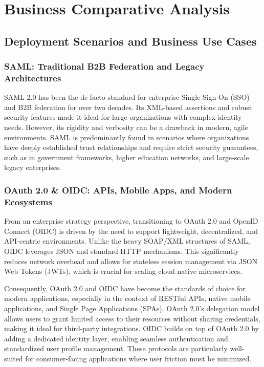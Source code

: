 \documentclass[../memoire.tex]{subfiles}
\begin{document}
\chapter{Business Comparative Analysis} \label{chap_four}



\section{Deployment Scenarios and Business Use Cases}

\subsection{SAML: Traditional B2B Federation and Legacy Architectures}
SAML 2.0 has been the de facto standard for enterprise Single Sign-On (SSO) and B2B federation for over two decades. Its XML-based assertions and robust security features made it ideal for large organizations with complex identity needs. However, its rigidity and verbosity can be a drawback in modern, agile environments. SAML is predominantly found in scenarios where organizations have deeply established trust relationships and require strict security guarantees, such as in government frameworks, higher education networks, and large-scale legacy enterprises.

\subsection{OAuth 2.0 \& OIDC: APIs, Mobile Apps, and Modern Ecosystems}
From an enterprise strategy perspective, transitioning to OAuth 2.0 and OpenID Connect (OIDC) is driven by the need to support lightweight, decentralized, and API-centric environments. Unlike the heavy SOAP/XML structures of SAML, OIDC leverages JSON and standard HTTP mechanisms. This significantly reduces network overhead and allows for stateless session management via JSON Web Tokens (JWTs), which is crucial for scaling cloud-native microservices.

Consequently, OAuth 2.0 and OIDC have become the standards of choice for modern applications, especially in the context of RESTful APIs, native mobile applications, and Single Page Applications (SPAs). OAuth 2.0's delegation model allows users to grant limited access to their resources without sharing credentials, making it ideal for third-party integrations. OIDC builds on top of OAuth 2.0 by adding a dedicated identity layer, enabling seamless authentication and standardized user profile management. These protocols are particularly well-suited for consumer-facing applications where user friction must be minimized.
\end{document}
